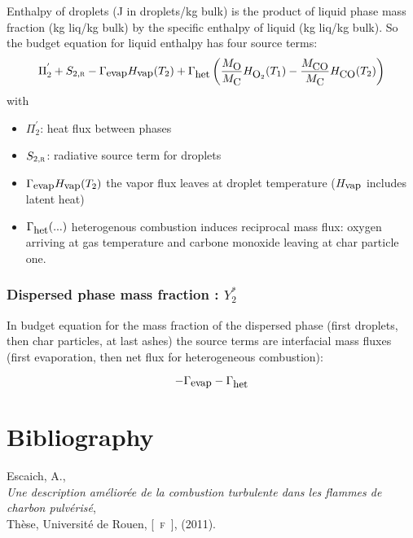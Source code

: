 Enthalpy of droplets (J in droplets/kg bulk) is the product of liquid phase mass
fraction (kg liq/kg bulk) by the specific enthalpy of liquid (kg liq/kg
bulk). So the budget equation for liquid enthalpy has four source terms:
\begin{equation}
     \Pi_{2}^{'}+S_{2,\mbox{\scriptsize\textsc{r}}}-\Gamma_{\mbox{\small evap}}H_{\mbox{\small vap}}(T_{2})
                        +\Gamma_{\mbox{\small het}}\left( \frac{M_{\mbox{\small O}}}{M_{\mbox{\small C}}}H_{\mbox{\small O}_{2}}(T_{1})
                                      -\frac{M_{\mbox{\small CO}   }}{M_{\mbox{\small C}}}H_{\mbox{\small CO}   }(T_{2})\right) 
\end{equation}
with
\begin{itemize}
\item $\Pi_{2}^{'}$: heat flux between phases
\item $S_{2,\mbox{\scriptsize\textsc{r}}}$: radiative source term for droplets
\item $\Gamma_{\mbox{\small evap}}H_{\mbox{\small vap}}(T_{2})$ the vapor flux leaves at droplet temperature ($H_{\mbox{\small vap}}$ includes latent heat)
\item $\Gamma_{\mbox{\small het}}(...)$ heterogenous combustion induces reciprocal mass flux: oxygen arriving at gas temperature and carbone monoxide leaving 
at char particle one.
\end{itemize}

\subsubsection*{Dispersed phase mass fraction : $Y_{2}^{*}$}

In budget equation for the mass fraction of the dispersed phase (first droplets,
then char particles, at last ashes) the source terms are interfacial mass fluxes
(first evaporation, then net flux for heterogeneous combustion):

\begin{equation}
     -\Gamma_{\mbox{\small evap}}-\Gamma_{\mbox{\small het}}
\end{equation}

\section*{Bibliography}
\begin{thebibliography}{1}

{\sc Escaich, A.},\\
{\em Une description am\'elior\'ee de la combustion turbulente dans les flammes de charbon pulv\'eris\'e},\\
Th\`ese, Universit\'e de Rouen, [\mbox{\textsc{ f }}], (2011).

\end{thebibliography}
\newpage

